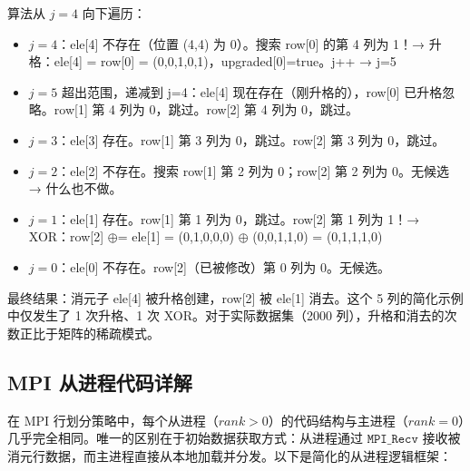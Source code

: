 \documentclass[a4paper]{article}
\begin{document}
算法从 $j=4$ 向下遍历：
\begin{itemize}
    \item $j=4$：ele[4] 不存在（位置 (4,4) 为 0）。搜索 row[0] 的第 4 列为 1！→ 升格：ele[4] = row[0] = (0,0,1,0,1)，upgraded[0]=true。j++ → j=5
    \item $j=5$ 超出范围，递减到 j=4：ele[4] 现在存在（刚升格的），row[0] 已升格忽略。row[1] 第 4 列为 0，跳过。row[2] 第 4 列为 0，跳过。
    \item $j=3$：ele[3] 存在。row[1] 第 3 列为 0，跳过。row[2] 第 3 列为 0，跳过。
    \item $j=2$：ele[2] 不存在。搜索 row[1] 第 2 列为 0；row[2] 第 2 列为 0。无候选 → 什么也不做。
    \item $j=1$：ele[1] 存在。row[1] 第 1 列为 0，跳过。row[2] 第 1 列为 1！→ XOR：row[2] $\oplus$= ele[1] = (0,1,0,0,0) $\oplus$ (0,0,1,1,0) = (0,1,1,1,0)
    \item $j=0$：ele[0] 不存在。row[2]（已被修改）第 0 列为 0。无候选。
\end{itemize}

最终结果：消元子 ele[4] 被升格创建，row[2] 被 ele[1] 消去。这个 5 列的简化示例中仅发生了 1 次升格、1 次 XOR。对于实际数据集（2000 列），升格和消去的次数正比于矩阵的稀疏模式。

\subsection{MPI 从进程代码详解}

在 MPI 行划分策略中，每个从进程（$rank > 0$）的代码结构与主进程（$rank = 0$）几乎完全相同。唯一的区别在于初始数据获取方式：从进程通过 $\texttt{MPI\_Recv}$ 接收被消元行数据，而主进程直接从本地加载并分发。以下是简化的从进程逻辑框架：
\end{document}
